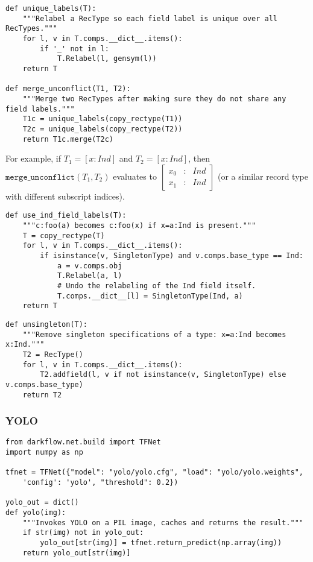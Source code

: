 \begin{lstlisting}[label={lst:mergeunconflict},caption={merge\_unconflict()}]
def unique_labels(T):
    """Relabel a RecType so each field label is unique over all RecTypes."""
    for l, v in T.comps.__dict__.items():
        if '_' not in l:
            T.Relabel(l, gensym(l))
    return T

def merge_unconflict(T1, T2):
    """Merge two RecTypes after making sure they do not share any field labels."""
    T1c = unique_labels(copy_rectype(T1))
    T2c = unique_labels(copy_rectype(T2))
    return T1c.merge(T2c)
\end{lstlisting}

For example, if $T_1 = [x:Ind]$ and $T_2 = [x:Ind]$, then $\mathtt{merge\_unconflict}(T_1, T_2)$ evaluates to $\left[\begin{array}{rcl} x_0&:&Ind \\ x_1&:&Ind \end{array}\right]$ (or a similar record type with different subscript indices).

\begin{lstlisting}[label={lst:useindfieldlabels},caption={use\_ind\_field\_labels()}]
def use_ind_field_labels(T):
    """c:foo(a) becomes c:foo(x) if x=a:Ind is present."""
    T = copy_rectype(T)
    for l, v in T.comps.__dict__.items():
        if isinstance(v, SingletonType) and v.comps.base_type == Ind:
            a = v.comps.obj
            T.Relabel(a, l)
            # Undo the relabeling of the Ind field itself.
            T.comps.__dict__[l] = SingletonType(Ind, a)
    return T
\end{lstlisting}

\begin{lstlisting}[label={lst:unsingleton},caption={unsingleton()}]
def unsingleton(T):
    """Remove singleton specifications of a type: x=a:Ind becomes x:Ind."""
    T2 = RecType()
    for l, v in T.comps.__dict__.items():
        T2.addfield(l, v if not isinstance(v, SingletonType) else v.comps.base_type)
    return T2
\end{lstlisting}

\subsubsection{YOLO}

\begin{lstlisting}[label=lst:yolo, caption=Invoking YOLO]
from darkflow.net.build import TFNet
import numpy as np

tfnet = TFNet({"model": "yolo/yolo.cfg", "load": "yolo/yolo.weights",
    'config': 'yolo', "threshold": 0.2})

yolo_out = dict()
def yolo(img):
    """Invokes YOLO on a PIL image, caches and returns the result."""
    if str(img) not in yolo_out:
        yolo_out[str(img)] = tfnet.return_predict(np.array(img))
    return yolo_out[str(img)]
\end{lstlisting}


